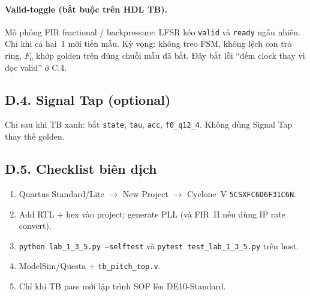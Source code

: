 \paragraph{Valid-toggle (bắt buộc trên HDL TB).}
Mô phỏng FIR fractional / backpressure: LFSR kéo \texttt{valid} và \texttt{ready} ngẫu nhiên. Chỉ khi cả hai~1 mới tiến mẫu. Kỳ vọng: không treo FSM, không lệch con trỏ ring, $F_0$ khớp golden trên đúng chuỗi mẫu đã bắt. Đây bắt lỗi ``đếm clock thay vì đọc valid'' ở C.4.

\subsection*{D.4. Signal Tap (optional)}
Chỉ sau khi TB xanh: bắt \texttt{state}, \texttt{tau}, \texttt{acc}, \texttt{f0\_q12\_4}. Không dùng Signal Tap thay thế golden.

\subsection*{D.5. Checklist biên dịch}
\begin{enumerate}[itemsep=1pt]
  \item Quartus Standard/Lite $\to$ New Project $\to$ Cyclone~V \texttt{5CSXFC6D6F31C6N}.
  \item Add RTL + hex vào project; generate PLL (và FIR~II nếu dùng IP rate convert).
  \item \texttt{python lab\_1\_3\_5.py --selftest} và \texttt{pytest test\_lab\_1\_3\_5.py} trên host.
  \item ModelSim/Questa + \texttt{tb\_pitch\_top.v}.
  \item Chỉ khi TB pass mới lập trình SOF lên DE10-Standard.
\end{enumerate}
